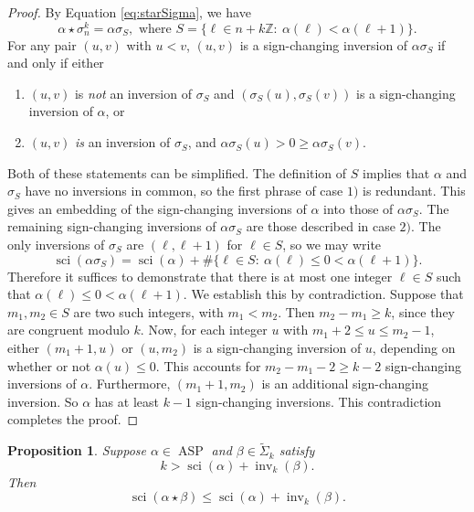 \documentclass[11pt]{article}
\newtheorem{prop}[theo]{Proposition}
\theoremstyle{definition}
\numberwithin{equation}{section}
\newcommand{\Z}{\mathbb{Z}}
\newcommand{\inv}{\operatorname{inv}}
\newcommand{\eaf}[1]{\widetilde{\Sigma}_{#1}}
\newcommand{\asp}{\operatorname{ASP}}
\newcommand{\sci}{\operatorname{sci}}
\begin{document}
\begin{proof}
By Equation \eqref{eq:starSigma}, we have
$$\alpha \star \sigma^k_n = \alpha \sigma_S,
\mbox{ where }
S = \{ \ell \in n + k \Z:\ \alpha(\ell) < \alpha(\ell+1)\}.$$
For any pair $(u,v)$ with $u < v$, $(u,v)$ is a sign-changing inversion of $\alpha \sigma_S$ if and only if either
\begin{enumerate}[label = \arabic*)]
    \item $(u,v)$ is \emph{not} an inversion of $\sigma_S$ and $(\sigma_S(u), \sigma_S(v))$ is a sign-changing inversion of $\alpha$, or
    \item $(u,v)$ \emph{is} an inversion of $\sigma_S$, and $\alpha \sigma_S (u) > 0 \geq \alpha \sigma_S(v)$.
\end{enumerate}
Both of these statements can be simplified. The definition of $S$ implies that $\alpha$ and $\sigma_S$ have no inversions in common, so the first phrase of case $1)$ is redundant. This gives an embedding of the sign-changing inversions of $\alpha$ into those of $\alpha \sigma_S$. The remaining sign-changing inversions of $\alpha \sigma_S$ are those described in case $2)$. The only inversions of $\sigma_S$ are $(\ell,\ell+1)$ for $\ell \in S$, so we may write
$$\sci(\alpha \sigma_S) = \sci(\alpha) + \# \{ \ell \in S:\ \alpha(\ell) \leq 0 < \alpha(\ell+1) \}.$$
Therefore it suffices to demonstrate that there is at most one integer $\ell \in S$ such that $\alpha(\ell) \leq 0 < \alpha(\ell+1)$. We establish this by contradiction. Suppose that $m_1, m_2 \in S$ are two such integers, with $m_1 < m_2$. Then $m_2 - m_1 \geq k$, since they are congruent modulo $k$. Now, for each integer $u$ with $m_1+2 \leq u \leq m_2-1$, either $(m_1+1,u)$ or $(u,m_2)$ is a sign-changing inversion of $u$, depending on whether or not $\alpha(u) \leq 0$. This accounts for $m_2-m_1-2  \geq k-2$ sign-changing inversions of $\alpha$. Furthermore, $(m_1+1,m_2)$ is an additional sign-changing inversion. So $\alpha$ has at least $k-1$ sign-changing inversions. This contradiction completes the proof.
\end{proof}

\begin{prop}
\label{prop:sciInvStar}
Suppose $\alpha \in \asp$ and $\beta \in \eaf{k}$ satisfy
$$k > \sci(\alpha) + \inv_k(\beta).$$
Then
$$\sci(\alpha \star \beta) \leq \sci(\alpha) + \inv_k(\beta).$$
\end{prop}
\end{document}
